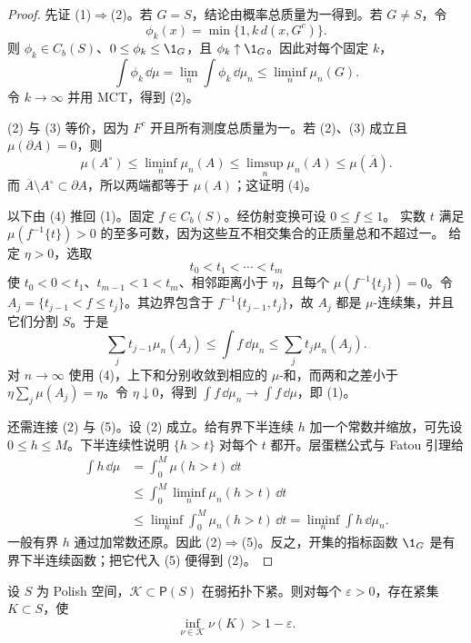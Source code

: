 \begin{proof}
先证 (1)$\Rightarrow$(2)。若 $G=S$，结论由概率总质量为一得到。若 $G\ne S$，令
\[
 \phi_k(x)=\min\{1,k\,d(x,G^c)\}.
\]
则 $\phi_k\in C_b(S)$、$0\le\phi_k\le\1_G$，且 $\phi_k\uparrow\1_G$。因此对每个固定 $k$，
\[
 \int\phi_k\,\dd\mu
 =\lim_n\int\phi_k\,\dd\mu_n
 \le\liminf_n\mu_n(G).
\]
令 $k\to\infty$ 并用 MCT，得到 (2)。

(2) 与 (3) 等价，因为 $F^c$ 开且所有测度总质量为一。若 (2)、(3) 成立且
$\mu(\partial A)=0$，则
\[
 \mu(A^\circ)\le\liminf_n\mu_n(A)
 \le\limsup_n\mu_n(A)\le\mu(\overline A).
\]
而 $\overline A\setminus A^\circ\subset\partial A$，所以两端都等于 $\mu(A)$；这证明 (4)。

以下由 (4) 推回 (1)。固定 $f\in C_b(S)$。经仿射变换可设 $0\le f\le1$。
实数 $t$ 满足 $\mu(f^{-1}\{t\})>0$ 的至多可数，因为这些互不相交集合的正质量总和不超过一。
给定 $\eta>0$，选取
\[
 t_0<t_1<\cdots<t_m
\]
使 $t_0<0<t_1$、$t_{m-1}<1<t_m$、相邻距离小于 $\eta$，且每个
$\mu(f^{-1}\{t_j\})=0$。令
$A_j=\{t_{j-1}<f\le t_j\}$。其边界包含于
$f^{-1}\{t_{j-1},t_j\}$，故 $A_j$ 都是 $\mu$-连续集，并且它们分割 $S$。于是
\[
 \sum_j t_{j-1}\mu_n(A_j)
 \le\int f\,\dd\mu_n
 \le\sum_j t_j\mu_n(A_j).
\]
对 $n\to\infty$ 使用 (4)，上下和分别收敛到相应的 $\mu$-和，而两和之差小于
$\eta\sum_j\mu(A_j)=\eta$。令 $\eta\downarrow0$，得到
$\int f\,\dd\mu_n\to\int f\,\dd\mu$，即 (1)。

还需连接 (2) 与 (5)。设 (2) 成立。给有界下半连续 $h$ 加一个常数并缩放，可先设
$0\le h\le M$。下半连续性说明 $\{h>t\}$ 对每个 $t$ 都开。层蛋糕公式与 Fatou 引理给
\[
\begin{aligned}
 \int h\,\dd\mu
 &=\int_0^M\mu(h>t)\,\dd t\\
 &\le\int_0^M\liminf_n\mu_n(h>t)\,\dd t\\
 &\le\liminf_n\int_0^M\mu_n(h>t)\,\dd t
 =\liminf_n\int h\,\dd\mu_n.
\end{aligned}
\]
一般有界 $h$ 通过加常数还原。因此 (2)$\Rightarrow$(5)。反之，开集的指标函数
$\1_G$ 是有界下半连续函数；把它代入 (5) 便得到 (2)。
\end{proof}

\begin{proposition}[弱紧族的一致紧逼近]\label{proposition:5-3-3-compact-tight}
设 $S$ 为 Polish 空间，$\mathcal K\subset\mathsf P(S)$ 在弱拓扑下紧。则对每个
$\varepsilon>0$，存在紧集 $K\subset S$，使
\[
 \inf_{\nu\in\mathcal K}\nu(K)>1-\varepsilon.
\]
\end{proposition}

